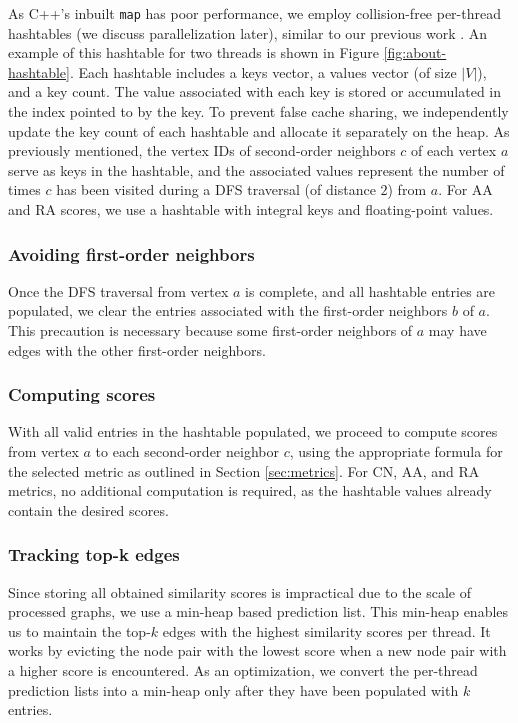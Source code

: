 As C++'s inbuilt \texttt{map} has poor performance, we employ collision-free per-thread hashtables (we discuss parallelization later), similar to our previous work \cite{sahu2023gvelouvain}. An example of this hashtable for two threads is shown in Figure \ref{fig:about-hashtable}. Each hashtable includes a keys vector, a values vector (of size $|V|$), and a key count. The value associated with each key is stored or accumulated in the index pointed to by the key. To prevent false cache sharing, we independently update the key count of each hashtable and allocate it separately on the heap. As previously mentioned, the vertex IDs of second-order neighbors $c$ of each vertex $a$ serve as keys in the hashtable, and the associated values represent the number of times $c$ has been visited during a DFS traversal (of distance $2$) from $a$. For AA and RA scores, we use a hashtable with integral keys and floating-point values.




\subsubsection{Avoiding first-order neighbors}

Once the DFS traversal from vertex $a$ is complete, and all hashtable entries are populated, we clear the entries associated with the first-order neighbors $b$ of $a$. This precaution is necessary because some first-order neighbors of $a$ may have edges with the other first-order neighbors.


\subsubsection{Computing scores}

With all valid entries in the hashtable populated, we proceed to compute scores from vertex $a$ to each second-order neighbor $c$, using the appropriate formula for the selected metric as outlined in Section \ref{sec:metrics}. For CN, AA, and RA metrics, no additional computation is required, as the hashtable values already contain the desired scores.


\subsubsection{Tracking top-k edges}

Since storing all obtained similarity scores is impractical due to the scale of processed graphs, we use a min-heap based prediction list. This min-heap enables us to maintain the top-$k$ edges with the highest similarity scores per thread. It works by evicting the node pair with the lowest score when a new node pair with a higher score is encountered. As an optimization, we convert the per-thread prediction lists into a min-heap only after they have been populated with $k$ entries.


